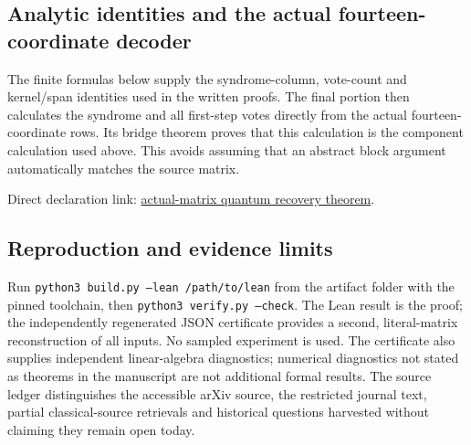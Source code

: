 \subsection{Analytic identities and the actual fourteen-coordinate decoder}
The finite formulas below supply the syndrome-column, vote-count and
kernel/span identities used in the written proofs. The final portion then
calculates the syndrome and all first-step votes directly from the actual
fourteen-coordinate rows. Its bridge theorem proves that this calculation
is the component calculation used above. This avoids assuming that an
abstract block argument automatically matches the source matrix.

Direct declaration link:
\href{https://github.com/alectionary/vibe-math/blob/2717b0ab2b59c2ccb71f0e369a9f21d80490c191/formalization/gallager-b-absorbing/Counterexample.lean#L259}{actual-matrix quantum recovery theorem}.

\subsection{Reproduction and evidence limits}
Run \texttt{python3 build.py --lean /path/to/lean} from the artifact
folder with the pinned toolchain, then \texttt{python3 verify.py --check}.
The Lean result is the proof; the independently regenerated JSON certificate
provides a second, literal-matrix reconstruction of all inputs.
No sampled experiment is used. The certificate also supplies independent
linear-algebra diagnostics; numerical diagnostics not stated as theorems
in the manuscript are not additional formal results.
The source ledger distinguishes the accessible arXiv source, the restricted
journal text, partial classical-source retrievals and historical questions
harvested without claiming they remain open today.
